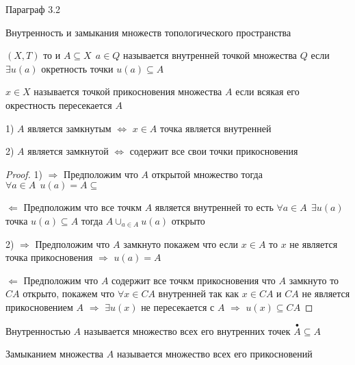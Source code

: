 \begin{title}[\Large]
  Параграф 3.2
\end{title}

\begin{title}[\Large]
  Внутренность и замыкания множеств топологического пространства
\end{title}

\begin{define}
  $(X, T)$ то и $A \subseteq X ~~ a \in Q$ называется внутренней точкой
  множества $Q$ если $\exists u(a)$ окретность точки $u(a) \subseteq A$
\end{define}

\begin{define}
  $x \in X$ называется точкой прикосновения множества $A$ если всякая его
  окрестность пересекается $A$
\end{define}

\begin{theorem}
  1) $A$ является замкнутым $\Leftrightarrow$ $x \in A$ точка является
  внутренней

  2) $A$ является замкнутой $\Leftrightarrow$ содержит все свои точки
  прикосновения
\end{theorem}

\begin{proof}
  1) $\Rightarrow$ Предположим что $A$ открытой множество тогда $\forall a \in A
  ~~ u(a) = A \subseteq$

  $\Leftarrow$ Предположим что все точкм $A$ является внутренней то есть
  $\forall a \in A ~~ \exists u(a)$ точка $u(a) \subseteq A$ тогда
  $A \cup_{a \in A} u(a)$ открыто

  2) $\Rightarrow$ Предположим что $A$ замкнуто покажем что если $x \in A$
  то $x$ не является точка прикосновения $\Rightarrow$ $u(a) = A$

  $\Leftarrow$ Предположим что $A$ содержит все точкм прикосновения что $A$
  замкнуто то $CA$ открыто, покажем что $\forall x \in CA$ внутренней так как
  $x \in CA$ и $CA$ не является прикосновением $A$ $\Rightarrow$ $\exists u(x)$
  не пересекается с $A$ $\Rightarrow$ $u(x) \subseteq CA$
\end{proof}

\begin{block}[Следствие]
  Внутренностью $A$ называется множество всех его внутренних точек
  $\stackrel{\bullet}{A} \subseteq A$
\end{block}

\begin{define}[Замыкания]
  Замыканием множества $A$ называется множество всех его прикосновений
\end{define}

